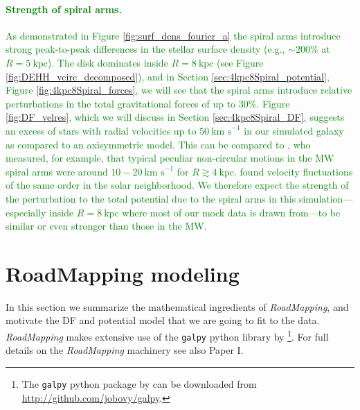 \documentclass[iop,revtex4,numberedappendix,appendixfloats]{emulateapj}
\newcommand{\RM}{{\sl RoadMapping}}
\newcommand{\NEW}[1]{\textcolor{Green}{#1}}
\begin{document}
\NEW{\paragraph{Strength of spiral arms.} As demonstrated in Figure \ref{fig:surf_dens_fourier_a} the spiral arms introduce strong peak-to-peak differences in the stellar surface density (e.g., $\sim200\%$  at $R=5~\text{kpc}$). The disk dominates inside $R=8~\text{kpc}$ (see Figure \ref{fig:DEHH_vcirc_decomposed}), and in Section \ref{sec:4kpc8Spiral_potential}, Figure \ref{fig:4kpc8Spiral_forces}, we will see that the spiral arms introduce relative perturbations in the total gravitational forces of up to $30\%$. Figure \ref{fig:DF_velres}, which we will discuss in Section \ref{sec:4kpc8Spiral_DF}, suggests an excess of stars with radial velocities up to $50~\text{km s}^{-1}$ in our simulated galaxy as compared to an axisymmetric model. This can be compared to \citet{2014ApJ...783..130R}, who measured, for example, that typical peculiar non-circular motions in the MW spiral arms were around $10-20~\text{km s}^{-1}$ for $R \gtrsim 4~\text{kpc}$. \citet{2012MNRAS.425.2335S} found velocity fluctuations of the same order in the solar neighborhood. We therefore expect the strength of the perturbation to the total potential due to the spiral arms in this simulation---especially inside $R=8~\text{kpc}$ where most of our mock data is drawn from---to be similar or even stronger than those in the MW.}

\section{RoadMapping modeling} \label{sec:RoadMapping}

In this section we summarize the mathematical ingredients of \RM{}, and motivate the DF and potential model that we are going to fit to the data. \RM{} makes extensive use of the \texttt{galpy} python library by \citet{2015ApJS..216...29B}\footnote{The \texttt{galpy} python package by \citet{2015ApJS..216...29B} can be downloaded from \url{http://github.com/jobovy/galpy}.}. For full details on the \RM{} machinery see also Paper I.
\end{document}
